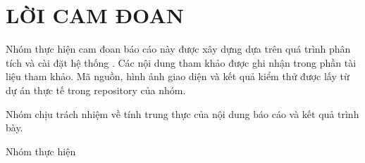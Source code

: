 \chapter*{LỜI CAM ĐOAN}
{}

Nhóm thực hiện cam đoan báo cáo này được xây dựng dựa trên quá trình phân tích và cài đặt hệ thống \projectname{}. Các nội dung tham khảo được ghi nhận trong phần tài liệu tham khảo. Mã nguồn, hình ảnh giao diện và kết quả kiểm thử được lấy từ dự án thực tế trong repository của nhóm.

Nhóm chịu trách nhiệm về tính trung thực của nội dung báo cáo và kết quả trình bày.

\vspace{1cm}
\begin{flushright}
Nhóm thực hiện
\end{flushright}
\clearpage
